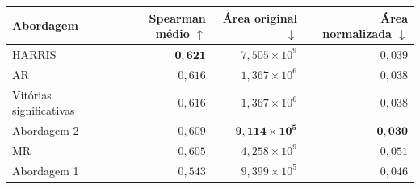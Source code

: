 \begin{tabular}{lrrr}
\toprule
Abordagem & Spearman médio $\uparrow$ & Área original $\downarrow$ & Área normalizada $\downarrow$ \\
\midrule
HARRIS & $\mathbf{0{,}621}$ & $7{,}505\times 10^{9}$ & $0{,}039$ \\
AR & $0{,}616$ & $1{,}367\times 10^{6}$ & $0{,}038$ \\
Vitórias significativas & $0{,}616$ & $1{,}367\times 10^{6}$ & $0{,}038$ \\
Abordagem 2 & $0{,}609$ & $\mathbf{9{,}114\times 10^{5}}$ & $\mathbf{0{,}030}$ \\
MR & $0{,}605$ & $4{,}258\times 10^{9}$ & $0{,}051$ \\
Abordagem 1 & $0{,}543$ & $9{,}399\times 10^{5}$ & $0{,}046$ \\
\bottomrule
\end{tabular}
